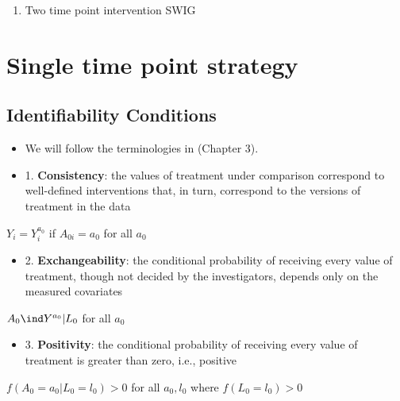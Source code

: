 \documentclass[dvipdfmx,10pt]{article}
\begin{document}
\begin{enumerate}
\item Two time point intervention SWIG
\label{sec:orgab70a31}
\begin{center}
\end{center}
\end{enumerate}


\section{Single time point strategy}
\label{sec:org2dae0b8}
\subsection{Identifiability Conditions}
\label{sec:org58c4afe}
\begin{itemize}
\item We will follow the terminologies in \cite{hernanCausalInference2019} (Chapter 3).
\item 1. \textbf{Consistency}: the values of treatment under comparison correspond to well-defined interventions that, in turn, correspond to the versions of treatment in the data
\end{itemize}
\begin{center}
\(Y_{i} = Y_{i}^{a_{0}}\) if \(A_{0i} = a_{0}\) for all \(a_{0}\)
\end{center}
\begin{itemize}
\item 2. \textbf{Exchangeability}: the conditional probability of receiving every value of treatment, though not decided by the investigators, depends only on the measured covariates
\end{itemize}
\begin{center}
\(A_{0} \ind Y^{a_{0}} | L_{0}\) for all \(a_{0}\)
\end{center}
\begin{itemize}
\item 3. \textbf{Positivity}: the conditional probability of receiving every value of treatment is greater than zero, i.e., positive
\end{itemize}
\begin{center}
\(f(A_{0} = a_{0} | L_{0} = l_{0}) > 0\) for all \(a_{0},l_{0}\) where \(f(L_{0} = l_{0}) > 0\)
\end{center}
\end{document}
